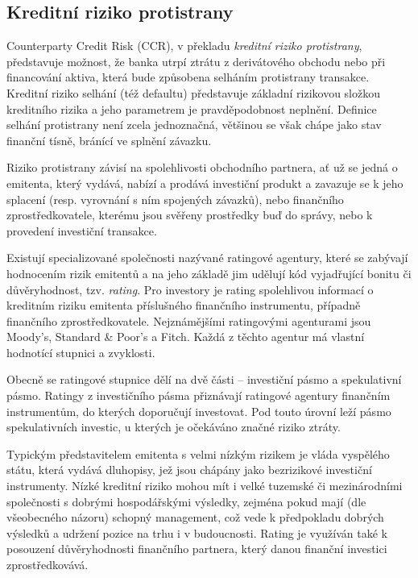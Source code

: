 \documentclass[a4paper,12pt]{report}
\theoremstyle{definition} \newtheorem{definice}[veta]{Definice}
\theoremstyle{remark}
\begin{document}
\subsection{Kreditní riziko protistrany}\label{CCR_kap}
Counterparty Credit Risk (CCR), v překladu \textit{kreditní riziko protistrany},  představuje možnost, že banka utrpí ztrátu z derivátového obchodu nebo při financování aktiva, která bude způsobena selháním protistrany transakce. 
Kreditní riziko selhání (též defaultu) představuje základní rizikovou složkou kreditního rizika a jeho parametrem je pravděpodobnost neplnění. 
Definice selhání protistrany není zcela jednoznačná, většinou se však chápe jako stav finanční tísně, bránící ve splnění závazku.

Riziko protistrany závisí na spolehlivosti obchodního partnera, ať už se jedná o emitenta, který vydává, nabízí a prodává investiční produkt a zavazuje se k jeho splacení (resp. vyrovnání s ním spojených závazků), nebo finančního zprostředkovatele, kterému jsou svěřeny prostředky buď do správy, nebo k provedení investiční transakce.

Existují specializované společnosti nazývané ratingové agentury, které se zabývají hodnocením rizik emitentů %
a na jeho základě jim udělují kód vyjadřující bonitu či důvěryhodnost, tzv. \textit{rating}.
Pro investory je rating spolehlivou informací o kreditním riziku emitenta příslušného finančního instrumentu, případně finančního zprostředkovatele. 
Nejznámějšími ratingovými agenturami jsou Moody's, Standard \& Poor's a Fitch. Každá z těchto agentur má vlastní hodnotící stupnici a zvyklosti.

Obecně se ratingové stupnice dělí na dvě části -- investiční pásmo a spekulativní pásmo.
Ratingy z investičního pásma přiznávají ratingové agentury finančním instrumentům, do kterých doporučují investovat. Pod touto úrovní leží pásmo spekulativních investic, u kterých je očekáváno značné riziko ztráty.

Typickým představitelem emitenta s velmi nízkým rizikem je vláda vyspělého státu, která vydává dluhopisy, jež jsou chápány jako bezrizikové  investiční instrumenty. Nízké kreditní riziko mohou mít i velké tuzemské či mezinárodními společnosti s dobrými hospodářskými výsledky, zejména pokud mají (dle všeobecného názoru) schopný management, což vede k předpokladu dobrých výsledků a udržení pozice na trhu i v budoucnosti.
Rating je využíván také k posouzení  důvěryhodnosti finančního partnera, který danou finanční investici zprostředkovává.
\end{document}
